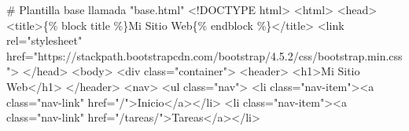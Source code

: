 \documentclass[
  a4paper,
  DIV=11,
  numbers=noendperiod,
  onepage,
  openany]{scrreprt}
\newenvironment{Shaded}{\begin{snugshade}}{\end{snugshade}}
\newcommand{\CommentTok}[1]{\textcolor[rgb]{0.37,0.37,0.37}{#1}}
\newcommand{\KeywordTok}[1]{\textcolor[rgb]{0.00,0.23,0.31}{#1}}
\newcommand{\NormalTok}[1]{\textcolor[rgb]{0.00,0.23,0.31}{#1}}
\newcommand{\OperatorTok}[1]{\textcolor[rgb]{0.37,0.37,0.37}{#1}}
\newcommand{\StringTok}[1]{\textcolor[rgb]{0.13,0.47,0.30}{#1}}
\begin{document}
\begin{Shaded}
\begin{Highlighting}[]
\CommentTok{\# Plantilla base llamada "base.html"}
\OperatorTok{\textless{}!}\NormalTok{DOCTYPE html}\OperatorTok{\textgreater{}}
\OperatorTok{\textless{}}\NormalTok{html}\OperatorTok{\textgreater{}}
\OperatorTok{\textless{}}\NormalTok{head}\OperatorTok{\textgreater{}}
    \OperatorTok{\textless{}}\NormalTok{title}\OperatorTok{\textgreater{}}\NormalTok{\{}\OperatorTok{\%}\NormalTok{ block title }\OperatorTok{\%}\NormalTok{\}Mi Sitio Web\{}\OperatorTok{\%}\NormalTok{ endblock }\OperatorTok{\%}\NormalTok{\}}\OperatorTok{\textless{}/}\NormalTok{title}\OperatorTok{\textgreater{}}
    \OperatorTok{\textless{}}\NormalTok{link rel}\OperatorTok{=}\StringTok{"stylesheet"}\NormalTok{ href}\OperatorTok{=}\StringTok{"https://stackpath.bootstrapcdn.com/bootstrap/4.5.2/css/bootstrap.min.css"}\OperatorTok{\textgreater{}}
\OperatorTok{\textless{}/}\NormalTok{head}\OperatorTok{\textgreater{}}
\OperatorTok{\textless{}}\NormalTok{body}\OperatorTok{\textgreater{}}
    \OperatorTok{\textless{}}\NormalTok{div }\KeywordTok{class}\OperatorTok{=}\StringTok{"container"}\OperatorTok{\textgreater{}}
        \OperatorTok{\textless{}}\NormalTok{header}\OperatorTok{\textgreater{}}
            \OperatorTok{\textless{}}\NormalTok{h1}\OperatorTok{\textgreater{}}\NormalTok{Mi Sitio Web}\OperatorTok{\textless{}/}\NormalTok{h1}\OperatorTok{\textgreater{}}
        \OperatorTok{\textless{}/}\NormalTok{header}\OperatorTok{\textgreater{}}
        \OperatorTok{\textless{}}\NormalTok{nav}\OperatorTok{\textgreater{}}
            \OperatorTok{\textless{}}\NormalTok{ul }\KeywordTok{class}\OperatorTok{=}\StringTok{"nav"}\OperatorTok{\textgreater{}}
                \OperatorTok{\textless{}}\NormalTok{li }\KeywordTok{class}\OperatorTok{=}\StringTok{"nav{-}item"}\OperatorTok{\textgreater{}\textless{}}\NormalTok{a }\KeywordTok{class}\OperatorTok{=}\StringTok{"nav{-}link"}\NormalTok{ href}\OperatorTok{=}\StringTok{"/"}\OperatorTok{\textgreater{}}\NormalTok{Inicio}\OperatorTok{\textless{}/}\NormalTok{a}\OperatorTok{\textgreater{}\textless{}/}\NormalTok{li}\OperatorTok{\textgreater{}}
                \OperatorTok{\textless{}}\NormalTok{li }\KeywordTok{class}\OperatorTok{=}\StringTok{"nav{-}item"}\OperatorTok{\textgreater{}\textless{}}\NormalTok{a }\KeywordTok{class}\OperatorTok{=}\StringTok{"nav{-}link"}\NormalTok{ href}\OperatorTok{=}\StringTok{"/tareas/"}\OperatorTok{\textgreater{}}\NormalTok{Tareas}\OperatorTok{\textless{}/}\NormalTok{a}\OperatorTok{\textgreater{}\textless{}/}\NormalTok{li}\OperatorTok{\textgreater{}}

\end{Highlighting}
\end{Shaded}
\end{document}
